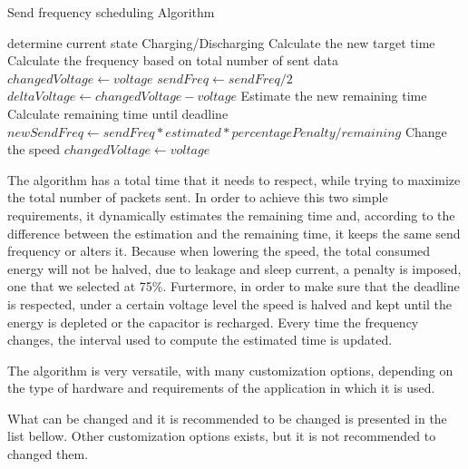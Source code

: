 \newcommand{\var}[1]{{\ttfamily#1}}%
\begin{algorithm}[t]
  \caption{Send frequency scheduling Algorithm}\label{euclid}
  \begin{algorithmic}[1]
    \Comment{}
    \State determine current state Charging/Discharging
        \State Calculate the new target time
        \State Calculate the frequency based on total number of sent data
        \State $changedVoltage \gets voltage$
    \EndIf
        \State $sendFreq \gets sendFreq / 2$
    \EndIf
    \State $deltaVoltage \gets changedVoltage - voltage$
        \State Estimate the new remaining time
        \State Calculate remaining time until deadline
        \State $newSendFreq \gets sendFreq*estimated*percentagePenalty/remaining $
            \State Change the speed
            \State $changedVoltage \gets voltage$
        \EndIf
    \EndIf
    \EndIf
    \EndProcedure
  \end{algorithmic}
\end{algorithm}


The algorithm has a total time that it needs to respect, while trying to maximize the total number
of packets sent. In order to achieve this two simple requirements, it dynamically estimates the
remaining time and, according to the difference between the estimation and the remaining time, it
keeps the same send frequency or alters it. Because when lowering the speed, the total consumed
energy will not be halved, due to leakage and sleep current, a penalty is imposed,
one that we selected at 75\%. Furtermore, in order to make sure that the deadline is respected,
under a certain voltage level the
speed is halved and kept until the energy is depleted or the capacitor is recharged. Every time the
frequency changes, the interval used to compute the estimated time is updated.

The algorithm is very versatile, with many customization options, depending on the type of hardware and
requirements of the application in which it is used.

What can be changed and it is recommended to be changed is presented in the list bellow.  Other
customization options exists, but it is not recommended to changed them.

